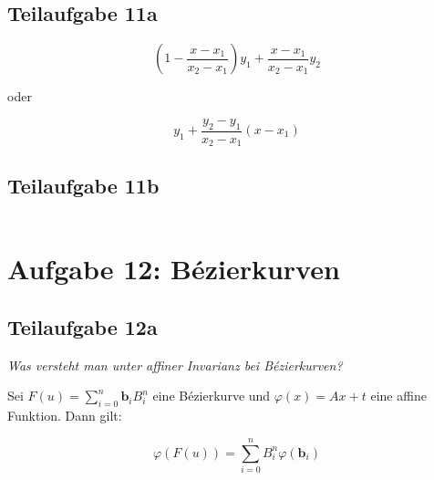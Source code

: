 \documentclass[a4paper]{scrartcl}
\begin{document}
\subsection*{Teilaufgabe 11a}

\[
	\left(1 - \frac{x - x_1}{x_2 - x_1}\right) y_1 + \frac{x - x_1}{x_2 - x_1} y_2
\]

oder

\[
	y_1 + \frac{y_2 - y_1}{x_2 - x_1} (x - x_1)
\]

\clearpage
\subsection*{Teilaufgabe 11b}
\inputminted[linenos, numbersep=5pt, tabsize=4, frame=lines, label=shader.frag]{glsl}{hatching.frag}

\clearpage
\section*{Aufgabe 12: Bézierkurven}
\subsection*{Teilaufgabe 12a}
\textit{Was versteht man unter affiner Invarianz bei Bézierkurven?}

Sei $F(u) = \sum_{i=0}^n \mathbf{b}_i B_i^n$ eine Bézierkurve und
$\varphi(x) = A x + t$ eine affine Funktion. Dann gilt:

\[\varphi(F(u)) = \sum_{i=0}^n B_i^n \varphi(\mathbf{b}_i)\]
\end{document}
